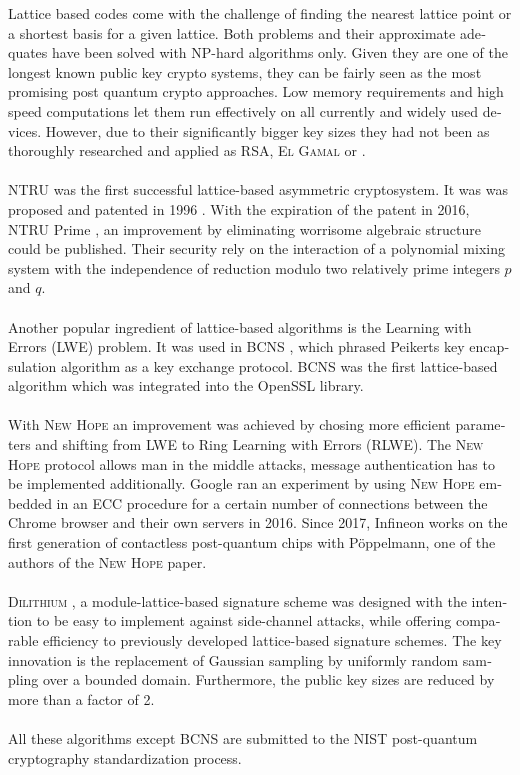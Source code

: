 \documentclass[a4paper,11pt]{article}
\begin{document}
\begin{otherlanguage}{english}
\begin{multicols}{2}
Lattice based codes come with the challenge of finding the nearest lattice point or a shortest basis for a given lattice. Both problems and their approximate adequates have been solved with NP-hard algorithms only. Given they are one of the longest known public key crypto systems, they can be fairly seen as the most promising post quantum crypto approaches. Low memory requirements and high speed computations let them run effectively on all currently and widely used devices. However, due to their significantly bigger key sizes they had not been as thoroughly researched and applied as \textsc{RSA}, \textsc{El Gamal} \cite{IMC} or . \\
\\
\textsc{NTRU} was the first successful lattice-based asymmetric cryptosystem. It was was proposed and patented in 1996 \cite{NTR}. With the expiration of the patent in 2016, \textsc{NTRU} Prime \cite{NTP}, an improvement by eliminating worrisome algebraic structure could be published. Their security rely on the interaction of a polynomial mixing system with the independence of reduction modulo two relatively prime integers $p$ and $q$. \\
\\
Another popular ingredient of lattice-based algorithms is the Learning with Errors (LWE) problem. It was used in \textsc{BCNS} \cite{BCN}, which phrased Peikerts key encapsulation algorithm as a key exchange protocol. \textsc{BCNS} was the first lattice-based algorithm which was integrated into the OpenSSL library. \\
\\
With \textsc{New Hope} \cite{NHP} an improvement was achieved by chosing more efficient parameters and shifting from LWE to Ring Learning with Errors (RLWE). The \textsc{New Hope} protocol allows man in the middle attacks, message authentication has to be implemented additionally. Google ran an experiment by using \textsc{New Hope} embedded in an ECC procedure for a certain number of connections between the Chrome browser and their own servers in 2016. Since 2017, Infineon works on the first generation of contactless post-quantum chips with Pöppelmann, one of the authors of the \textsc{New Hope} paper. \\
\\
\textsc{Dilithium} \cite{DLM}, a module-lattice-based signature scheme was designed with the intention to be easy to implement against side-channel attacks, while offering comparable efficiency to previously developed lattice-based signature schemes. The key innovation is the replacement of Gaussian sampling by uniformly random sampling over a bounded domain. Furthermore, the public key sizes are reduced by more than a factor of 2.\\
\\
All these algorithms except \textsc{BCNS} are submitted to the NIST post-quantum cryptography standardization process.


\end{multicols}
\end{otherlanguage}
\end{document}

